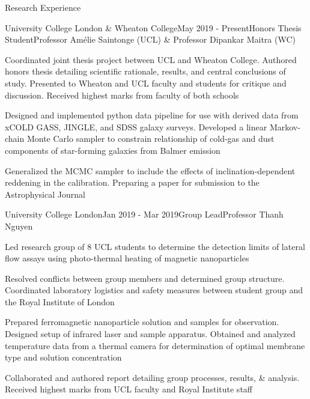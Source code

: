 \documentclass{resume} %
\begin{document}
\begin{rSection}{Research Experience}

\begin{rSubsection}{University College London \& Wheaton College}{May 2019 - Present}{Honors Thesis Student}{Professor Am\'{e}lie Saintonge (UCL) \& Professor Dipankar Maitra (WC)}
\item Coordinated joint thesis project between UCL and Wheaton College. Authored honors thesis detailing scientific rationale, results, and central conclusions of study. Presented to Wheaton and UCL faculty and students for critique and discussion. Received highest marks from faculty of both schools
\item Designed and implemented python data pipeline for use with derived data from xCOLD GASS, JINGLE, and SDSS galaxy surveys. Developed a linear Markov-chain Monte Carlo sampler to constrain relationship of cold-gas and dust components of star-forming galaxies from Balmer emission
\item Generalized the MCMC sampler to include the effects of inclination-dependent reddening in the calibration. Preparing a paper for submission to the Astrophysical Journal
\end{rSubsection}

\begin{rSubsection}{University College London}{Jan 2019 - Mar 2019}{Group Lead}{Professor Thanh Nguyen}
\item Led research group of 8 UCL students to determine the detection limits of lateral flow assays using photo-thermal heating of magnetic nanoparticles
\item Resolved conflicts between group members and determined group structure. Coordinated laboratory logistics and safety measures between student group and the Royal Institute of London
\item Prepared ferromagnetic nanoparticle solution and samples for observation. Designed setup of infrared laser and sample apparatus. Obtained and analyzed temperature data from a thermal camera for determination of optimal membrane type and solution concentration
\item Collaborated and authored report detailing group processes, results, \& analysis. Received highest marks from UCL faculty and Royal Institute staff
\end{rSubsection}


\end{rSection}
\end{document}
